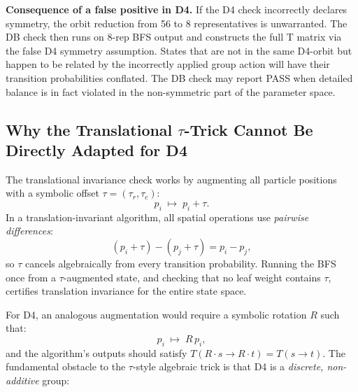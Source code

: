 \documentclass[12pt,a4paper]{article}
\theoremstyle{critical}
\theoremstyle{remark}
\begin{document}
\textbf{Consequence of a false positive in D4.} If the D4 check incorrectly declares
symmetry, the orbit reduction from 56 to 8 representatives is unwarranted. The DB
check then runs on 8-rep BFS output and constructs the full T matrix via the false D4
symmetry assumption. States that are not in the same D4-orbit but happen to be related
by the incorrectly applied group action will have their transition probabilities conflated.
The DB check may report PASS when detailed balance is in fact violated in the
non-symmetric part of the parameter space.

\subsection{Why the Translational $\tau$-Trick Cannot Be Directly Adapted for D4}
\label{sec:d4symbolic}

The translational invariance check works by augmenting all particle positions with a
symbolic offset $\tau = (\tau_r, \tau_c)$:
\[
p_i \;\mapsto\; p_i + \tau.
\]
In a translation-invariant algorithm, all spatial operations use \emph{pairwise
differences}:
\[
(p_i + \tau) - (p_j + \tau) = p_i - p_j,
\]
so $\tau$ cancels algebraically from every transition probability. Running the BFS once
from a $\tau$-augmented state, and checking that no leaf weight contains $\tau$, certifies
translation invariance for the entire state space.

For D4, an analogous augmentation would require a symbolic rotation $R$ such that:
\[
p_i \;\mapsto\; R\,p_i,
\]
and the algorithm's outputs should satisfy $T(R\cdot s \to R\cdot t) = T(s \to t)$.
The fundamental obstacle to the $\tau$-style algebraic trick is that D4 is a
\emph{discrete, non-additive} group:
\end{document}
